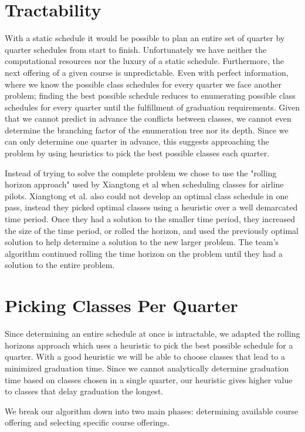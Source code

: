 \documentclass[11pt]{article} %
\begin{document}
\section{Tractability} With a static schedule it would be
possible to plan an entire set of quarter by quarter schedules from start to
finish. Unfortunately we have neither the computational resources nor the luxury
of a static schedule. Furthermore, the next offering of a given course is unpredictable.
Even with perfect information, where we know the possible class schedules for every
quarter we face another problem; finding the best possible schedule reduces to
enumerating possible class schedules for every quarter until the fulfillment of graduation
requirements. Given that we cannot predict in advance the
conflicts between classes, we cannot even determine the branching factor of the
enumeration tree nor its depth. Since we can only determine one quarter in
advance, this suggests approaching the problem by using heuristics to pick the
best possible classes each quarter.

Instead of trying to solve the complete problem we chose to use the "rolling
horizon approach" used by Xiangtong et al \cite{xiangton:informs} when
scheduling classes for airline pilots. Xiangtong et al. also could not develop
an optimal class schedule in one pass, instead they picked optimal classes
using a heuristic over a well demarcated time period. Once they had a solution
to the smaller time period, they increased the size of the time period, or rolled
the horizon, and used the previously optimal solution to help determine
a solution to the new larger problem. The team's algorithm continued rolling the
time horizon on the problem until they had a solution to the entire problem.

\section{Picking Classes Per Quarter} Since determining an entire schedule at
once is intractable, we adapted the rolling horizons approach which uses
a heuristic to pick the best possible schedule for a quarter. With a good
heuristic we will be able to choose classes that lead to a minimized graduation
time. Since we cannot analytically determine graduation time based on classes
chosen in a single quarter, our heuristic gives higher value to classes
that delay graduation the longest.

We break our algorithm down into two main phases: determining available course
offering and selecting specific course offerings.
\end{document}
